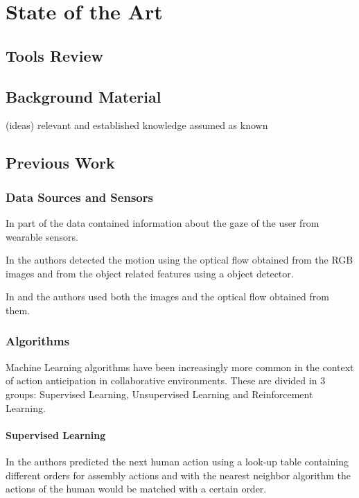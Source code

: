 \chapter{State of the Art}
\label{chapter:state_of_the_art}

\section{Tools Review}

\section{Background Material}

{\color{gray}
(ideas) relevant and established knowledge assumed as known
}

\section{Previous Work}

\subsection{Data Sources and Sensors}

In \cite{Schydlo2018} part of the data contained information about the gaze of the user from wearable sensors.

In \cite{Furnari2021} the authors detected the motion using the optical flow obtained from the RGB images and from the object related features using a object detector.

In \cite{Gammulle2019} and \cite{Wu2021} the authors used both the images and the optical flow obtained from them.

\subsection{Algorithms}

Machine Learning algorithms have been increasingly more common in the context of action anticipation in collaborative environments. These are divided in 3 groups: Supervised Learning, Unsupervised Learning and Reinforcement Learning.

\subsubsection{Supervised Learning}

In \cite{Maeda2016} the authors predicted the next human action using a look-up table containing different orders for assembly actions and with the nearest neighbor algorithm the actions of the human would be matched with a certain order.

